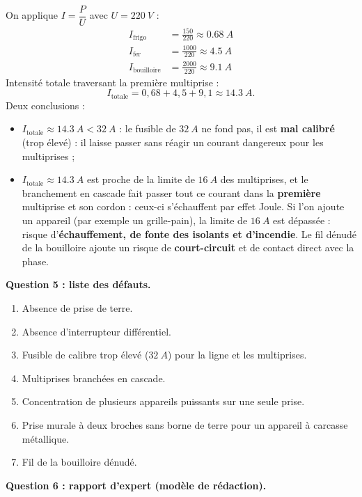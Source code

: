 \documentclass[11pt]{article}
\begin{document}
\begin{exoresolu}
On applique $I = \dfrac{P}{U}$ avec $U = \SI{220}{V}$ :
\begin{align*}
I_{\text{frigo}} &= \frac{150}{220} \approx \SI{0,68}{A} \\
I_{\text{fer}} &= \frac{1000}{220} \approx \SI{4,5}{A} \\
I_{\text{bouilloire}} &= \frac{2000}{220} \approx \SI{9,1}{A}
\end{align*}
Intensité totale traversant la première multiprise :
\[
I_{\text{totale}} = 0,68 + 4,5 + 9,1 \approx \SI{14,3}{A}.
\]
Deux conclusions :
\begin{itemize}
\item $I_{\text{totale}} \approx \SI{14,3}{A} < \SI{32}{A}$ : le fusible de $\SI{32}{A}$ ne fond pas, il est \textbf{mal calibré} (trop élevé) : il laisse passer sans réagir un courant dangereux pour les multiprises ;
\item $I_{\text{totale}} \approx \SI{14,3}{A}$ est proche de la limite de $\SI{16}{A}$ des multiprises, et le branchement en cascade fait passer tout ce courant dans la \textbf{première} multiprise et son cordon : ceux-ci s'échauffent par effet Joule. Si l'on ajoute un appareil (par exemple un grille-pain), la limite de $\SI{16}{A}$ est dépassée : risque d'\textbf{échauffement, de fonte des isolants et d'incendie}. Le fil dénudé de la bouilloire ajoute un risque de \textbf{court-circuit} et de contact direct avec la phase.
\end{itemize}

\textbf{Question 5 : liste des défauts.}

\begin{enumerate}
\item Absence de prise de terre.
\item Absence d'interrupteur différentiel.
\item Fusible de calibre trop élevé ($\SI{32}{A}$) pour la ligne et les multiprises.
\item Multiprises branchées en cascade.
\item Concentration de plusieurs appareils puissants sur une seule prise.
\item Prise murale à deux broches sans borne de terre pour un appareil à carcasse métallique.
\item Fil de la bouilloire dénudé.
\end{enumerate}

\textbf{Question 6 : rapport d'expert (modèle de rédaction).}


\end{exoresolu}
\end{document}
